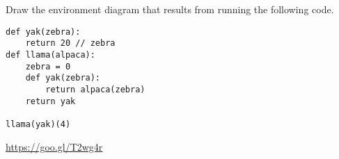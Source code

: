 \question Draw the environment diagram that results from running the following code.

\begin{lstlisting}
def yak(zebra):
    return 20 // zebra
def llama(alpaca):
    zebra = 0
    def yak(zebra):
        return alpaca(zebra)
    return yak
		
llama(yak)(4)
\end{lstlisting}

\begin{solution}[1in]
\url{https://goo.gl/T2wg4r}
\end{solution}